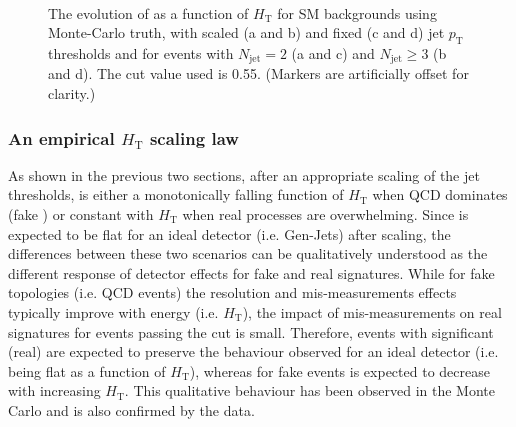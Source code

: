 \begin{figure}[!h]
  \begin{center} 
     \\
    \caption{\label{fig:ratio_vs_ht_055_ewk} The evolution of \RaT as
      a function of $H_{\mathrm{T}}$ for SM backgrounds using
      Monte-Carlo truth, with scaled (a and b) and fixed (c and d) jet
      $p_{\mathrm{T}}$ thresholds and for events with
      $N_{\mathrm{jet}} = 2$ (a and c) and $N_{\mathrm{jet}} \geq 3$
      (b and d). The \aT cut value used is 0.55. (Markers are
      artificially offset for clarity.)}
  \end{center}
\end{figure}

\subsubsection{An empirical $H_{\mathrm{T}}$ scaling law}    

As shown in the previous two sections, after an appropriate scaling of
the jet \pt thresholds, \RaT is either a monotonically falling
function of $H_{\mathrm{T}}$ when QCD dominates (fake \mymet) or constant
with $H_{\mathrm{T}}$ when real \mymet processes are overwhelming.  Since
\RaT is expected to be flat for an ideal detector (i.e. Gen-Jets)
after scaling, the differences between these two scenarios can be
qualitatively understood as the different response of detector effects
for fake and real \mymet signatures. While for fake \mymet topologies
(i.e. QCD events) the resolution and mis-measurements effects
typically improve with energy (i.e. $H_{\mathrm{T}}$), the impact of
mis-measurements on real \mymet signatures for events passing the \aT cut
is small. Therefore, events with significant (real) \mymet are
expected to preserve the behaviour observed for an ideal detector
(i.e. \RaT being flat as a function of $H_{\mathrm{T}}$), whereas for
fake \mymet events \RaT is expected to decrease with increasing
$H_{\mathrm{T}}$.  This qualitative behaviour has been observed in the
Monte Carlo and is also confirmed by the data.

